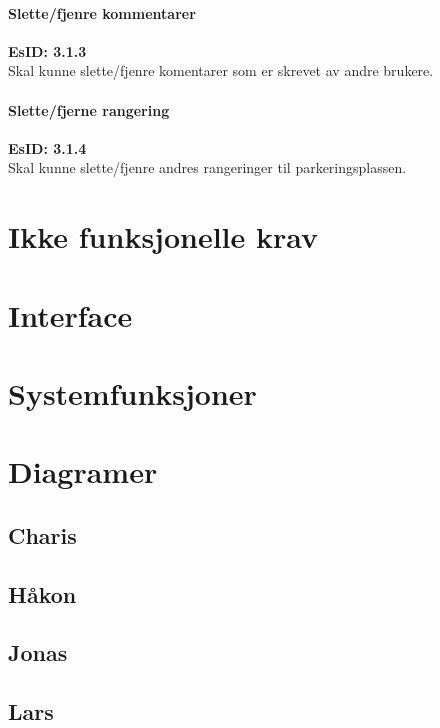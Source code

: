 \documentclass[12pt]{article}
\begin{document}
            \paragraph{Slette/fjenre kommentarer}
            \textbf{EsID: 3.1.3}\\Skal kunne slette/fjenre komentarer som er skrevet av andre brukere.

            \paragraph{Slette/fjerne rangering}
            \textbf{EsID: 3.1.4}\\Skal kunne slette/fjenre andres rangeringer til parkeringsplassen.
    
\section{Ikke funksjonelle krav}

\section{Interface}

\section{Systemfunksjoner}

\section{Diagramer}

    \subsection{Charis}

    \subsection{Håkon}

    \subsection{Jonas}

    \subsection{Lars}
\end{document}
